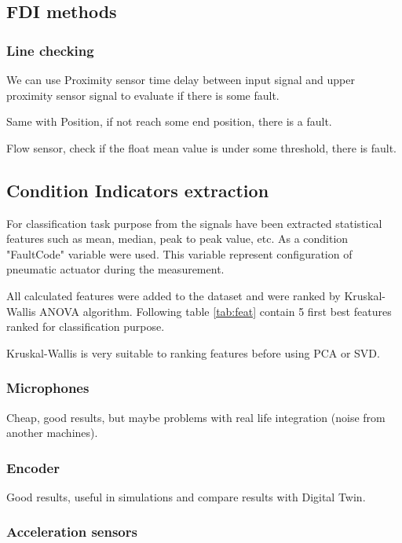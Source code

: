 \documentclass[class=article, crop=false]{standalone}
\begin{document}
\subsection{FDI methods}

\subsubsection{Line checking}

We can use Proximity sensor time delay between input signal and upper
proximity sensor signal to evaluate if there is some fault.

Same with Position, if not reach some end position, there is a fault.

Flow sensor, check if the float mean value is under some threshold, there
is fault.


\subsection{Condition Indicators extraction}

For classification task purpose from the signals have been extracted
statistical features such as mean, median, peak to peak value, etc.
As a condition "FaultCode" variable
were used. This variable represent configuration of pneumatic actuator
during the measurement.

All calculated features were added to the dataset and were ranked by
Kruskal-Wallis ANOVA algorithm. Following table \ref{tab:feat} contain
5 first best features ranked for classification purpose.

Kruskal-Wallis is very suitable to ranking features before using PCA or
SVD.


\subsubsection{Microphones}
Cheap, good results, but maybe problems with real life integration (noise
from another machines).

\subsubsection{Encoder}
Good results, useful in simulations and compare results with Digital Twin.

\subsubsection{Acceleration sensors}
\end{document}
